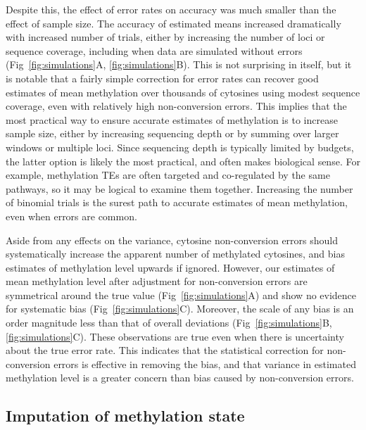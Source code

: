 \documentclass[10pt,letterpaper]{article}
\begin{document}
Despite this, the effect of error rates on accuracy was much smaller than the effect of sample size.
The accuracy of estimated means increased dramatically with increased number of trials, either by increasing the number of loci or sequence coverage, including when data are simulated without errors (Fig~\ref{fig:simulations}A, \ref{fig:simulations}B).
This is not surprising in itself, but it is notable that a fairly simple correction for error rates can recover good estimates of mean methylation over thousands of cytosines using modest sequence coverage, even with relatively high non-conversion errors.
This implies that the most practical way to ensure accurate estimates of methylation is to increase sample size, either by increasing sequencing depth or by summing over larger windows or multiple loci.
Since sequencing depth is typically limited by budgets, the latter option is likely the most practical, and often makes biological sense.
For example, methylation TEs are often targeted and co-regulated by the same pathways, so it may be logical to examine them together.
Increasing the number of binomial trials is the surest path to accurate estimates of mean methylation, even when errors are common.

Aside from any effects on the variance, cytosine non-conversion errors should systematically increase the apparent number of methylated cytosines, and bias estimates of methylation level upwards if ignored.
However, our estimates of mean methylation level after adjustment for non-conversion errors are symmetrical around the true value (Fig~\ref{fig:simulations}A) and show no evidence for systematic bias (Fig~\ref{fig:simulations}C).
Moreover, the scale of any bias is an order magnitude less than that of overall deviations (Fig~\ref{fig:simulations}B, \ref{fig:simulations}C).
These observations are true even when there is uncertainty about the true error rate.
This indicates that the statistical correction for non-conversion errors is effective in removing the bias, and that variance in estimated methylation level is a greater concern than bias caused by non-conversion errors.

\subsection*{Imputation of methylation state}
\end{document}
